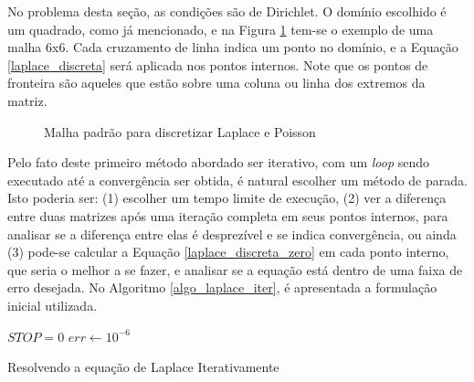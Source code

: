 \documentclass[journal]{IEEEtran}
\begin{document}
No problema desta seção, as condições são de Dirichlet. O domínio escolhido é um quadrado, como já mencionado, e na Figura \ref{malha_poisson} tem-se o exemplo de uma malha 6x6. Cada cruzamento de linha indica um ponto no domínio, e a Equação \ref{laplace_discreta} será aplicada nos pontos internos. Note que os pontos de fronteira são aqueles que estão sobre uma coluna ou linha dos extremos da matriz.

\begin{figure}[!ht]
\centering
{}
\caption{Malha padrão para discretizar Laplace e Poisson\label{malha_poisson}}
\end{figure}


Pelo fato deste primeiro método abordado ser iterativo, com um \textit{loop} sendo executado até a convergência ser obtida, é natural escolher um método de parada. Isto poderia ser: (1) escolher um tempo limite de execução, (2) ver a diferença entre duas matrizes após uma iteração completa em seus pontos internos, para analisar se a diferença entre elas é desprezível e se indica convergência, ou ainda (3) pode-se calcular a Equação \ref{laplace_discreta_zero} em cada ponto interno, que seria o melhor a se fazer, e analisar se a equação está dentro de uma faixa de erro desejada. No Algoritmo \ref{algo_laplace_iter}, é apresentada a formulação inicial utilizada.

\begin{algorithm}
\BlankLine
$STOP=0$\;
$err \leftarrow 10^{-6}$\;

\caption{Resolvendo a equação de Laplace Iterativamente}\label{algo_laplace_iter}
\end{algorithm}
\end{document}
